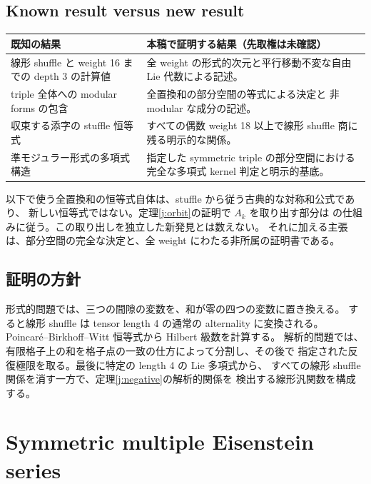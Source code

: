 \documentclass[12pt]{amsart}
\theoremstyle{definition}
\theoremstyle{remark}
\numberwithin{equation}{section}
\numberwithin{equation}{section}
\begin{document}
\subsection{Known result versus new result}
\begin{center}\small
\begin{tabular}{p{}p{}}
\toprule 既知の結果 & 本稿で証明する結果（先取権は未確認）\\\midrule
線形 shuffle と weight 16 までの depth 3 の計算値
\cite[Table 4]{j-hst} & 全 weight の形式的次元と平行移動不変な自由 Lie 代数による記述。\\
triple 全体への modular forms の包含 & 全置換和の部分空間の等式による決定と
非 modular な成分の記述。\\
収束する添字の stuffle 恒等式 & すべての偶数 weight 18 以上で線形 shuffle
商に残る明示的な関係。\\
準モジュラー形式の多項式構造 & 指定した symmetric triple の部分空間における
完全な多項式 kernel 判定と明示的基底。\\\bottomrule
\end{tabular}\end{center}
以下で使う全置換和の恒等式自体は、stuffle から従う古典的な対称和公式であり、
新しい恒等式ではない。定理\ref{j:orbit}の証明で $A_k$ を取り出す部分は
\cite[Lemma 6.5]{j-hst} の仕組みに従う。この取り出しを独立した新発見とは数えない。
それに加える主張は、部分空間の完全な決定と、全 weight にわたる非所属の証明書である。

\subsection{証明の方針}
形式的問題では、三つの間隙の変数を、和が零の四つの変数に置き換える。
すると線形 shuffle は tensor length 4 の通常の alternality に変換される。
Poincar\'e--Birkhoff--Witt 恒等式から Hilbert 級数を計算する。
解析的問題では、有限格子上の和を格子点の一致の仕方によって分割し、その後で
指定された反復極限を取る。最後に特定の length 4 の Lie 多項式から、
すべての線形 shuffle 関係を消す一方で、定理\ref{j:negative}の解析的関係を
検出する線形汎関数を構成する。

\section{Symmetric multiple Eisenstein series}
\end{document}
